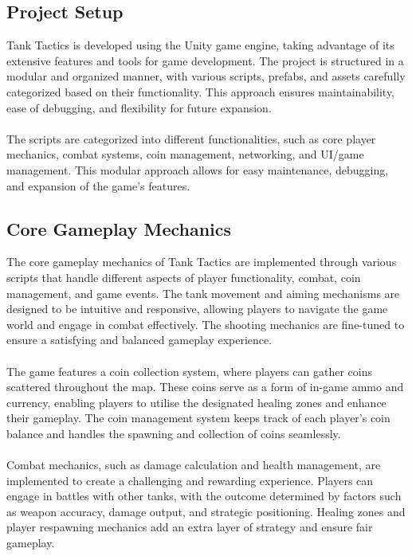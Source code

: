 \subsection{Project Setup}
Tank Tactics is developed using the Unity game engine, taking advantage of its extensive features and tools for game development. The project is structured in a modular and organized manner, with various scripts, prefabs, and assets carefully categorized based on their functionality. This approach ensures maintainability, ease of debugging, and flexibility for future expansion.
\\
\noindent
\\
The scripts are categorized into different functionalities, such as core player mechanics, combat systems, coin management, networking, and UI/game management. This modular approach allows for easy maintenance, debugging, and expansion of the game's features.

\subsection{Core Gameplay Mechanics}
The core gameplay mechanics of Tank Tactics are implemented through various scripts that handle different aspects of player functionality, combat, coin management, and game events. The tank movement and aiming mechanisms are designed to be intuitive and responsive, allowing players to navigate the game world and engage in combat effectively. The shooting mechanics are fine-tuned to ensure a satisfying and balanced gameplay experience.
\\
\noindent
\\
The game features a coin collection system, where players can gather coins scattered throughout the map. These coins serve as a form of in-game ammo and currency, enabling players to utilise the designated healing zones and enhance their gameplay. The coin management system keeps track of each player's coin balance and handles the spawning and collection of coins seamlessly.
\\
\noindent
\\
Combat mechanics, such as damage calculation and health management, are implemented to create a challenging and rewarding experience. Players can engage in battles with other tanks, with the outcome determined by factors such as weapon accuracy, damage output, and strategic positioning. Healing zones and player respawning mechanics add an extra layer of strategy and ensure fair gameplay.

